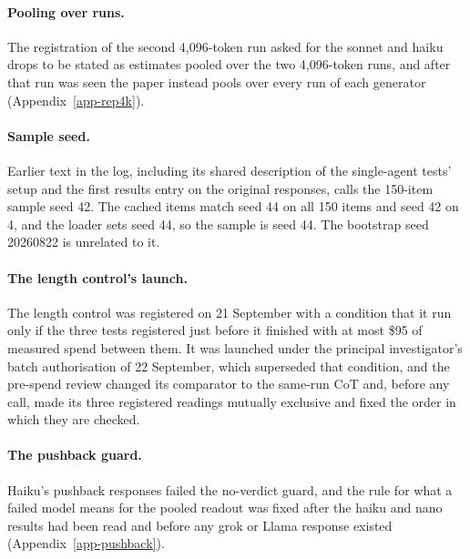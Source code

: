 \paragraph{Pooling over runs.}
The registration of the second 4,096-token run asked for the sonnet and haiku
drops to be stated as estimates pooled over the two 4,096-token runs, and
after that run was seen the paper instead pools over every run of each
generator (Appendix~\ref{app-rep4k}).

\paragraph{Sample seed.}
Earlier text in the log, including its shared description of the
single-agent tests' setup and the first results entry on the original
responses, calls the 150-item sample seed 42. The cached items match
seed 44 on all 150 items and seed 42 on 4, and the loader sets seed 44, so
the sample is seed 44. The bootstrap seed 20260822 is unrelated to it.

\paragraph{The length control's launch.}
The length control was registered on 21 September with a condition that it
run only if the three tests registered just before it finished with at most
\$95 of measured spend between them. It
was launched under the principal investigator's batch authorisation of 22
September, which superseded that condition, and the pre-spend review changed its
comparator to the same-run CoT and, before any call, made its three
registered readings mutually exclusive and fixed the order in which they are
checked.

\paragraph{The pushback guard.}
Haiku's pushback responses failed the no-verdict guard, and the rule for what
a failed model means for the pooled readout was fixed after the haiku and nano
results had been read and before any grok or Llama response existed
(Appendix~\ref{app-pushback}).

